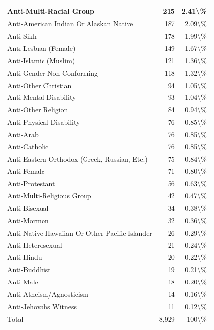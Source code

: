 \documentclass[
]{krantz}
\begin{document}
\begin{longtable}[t]{l|r|r}
\hline
Anti-Multi-Racial Group & 215 & 2.41\textbackslash{}\%\\
\hline
Anti-American Indian Or Alaskan Native & 187 & 2.09\textbackslash{}\%\\
\hline
Anti-Sikh & 178 & 1.99\textbackslash{}\%\\
\hline
Anti-Lesbian (Female) & 149 & 1.67\textbackslash{}\%\\
\hline
Anti-Islamic (Muslim) & 121 & 1.36\textbackslash{}\%\\
\hline
Anti-Gender Non-Conforming & 118 & 1.32\textbackslash{}\%\\
\hline
Anti-Other Christian & 94 & 1.05\textbackslash{}\%\\
\hline
Anti-Mental Disability & 93 & 1.04\textbackslash{}\%\\
\hline
Anti-Other Religion & 84 & 0.94\textbackslash{}\%\\
\hline
Anti-Physical Disability & 76 & 0.85\textbackslash{}\%\\
\hline
Anti-Arab & 76 & 0.85\textbackslash{}\%\\
\hline
Anti-Catholic & 76 & 0.85\textbackslash{}\%\\
\hline
Anti-Eastern Orthodox (Greek, Russian, Etc.) & 75 & 0.84\textbackslash{}\%\\
\hline
Anti-Female & 71 & 0.80\textbackslash{}\%\\
\hline
Anti-Protestant & 56 & 0.63\textbackslash{}\%\\
\hline
Anti-Multi-Religious Group & 42 & 0.47\textbackslash{}\%\\
\hline
Anti-Bisexual & 34 & 0.38\textbackslash{}\%\\
\hline
Anti-Mormon & 32 & 0.36\textbackslash{}\%\\
\hline
Anti-Native Hawaiian Or Other Pacific Islander & 26 & 0.29\textbackslash{}\%\\
\hline
Anti-Heterosexual & 21 & 0.24\textbackslash{}\%\\
\hline
Anti-Hindu & 20 & 0.22\textbackslash{}\%\\
\hline
Anti-Buddhist & 19 & 0.21\textbackslash{}\%\\
\hline
Anti-Male & 18 & 0.20\textbackslash{}\%\\
\hline
Anti-Atheism/Agnosticism & 14 & 0.16\textbackslash{}\%\\
\hline
Anti-Jehovahs Witness & 11 & 0.12\textbackslash{}\%\\
\hline
Total & 8,929 & 100\textbackslash{}\%\\
\hline
\end{longtable}
\end{document}
